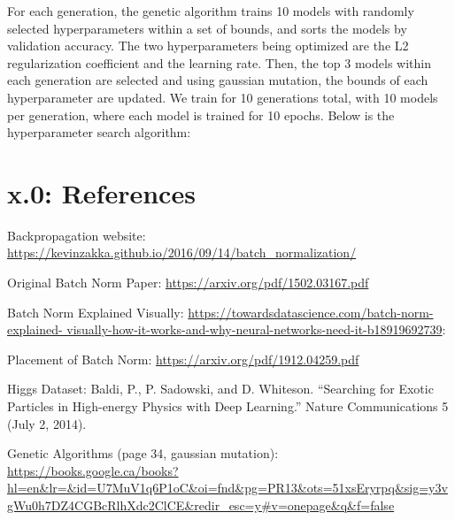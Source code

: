 \documentclass{article}
\begin{document}
\begin{multicols}{2}
For each generation, the genetic algorithm trains 10 models with randomly 
selected hyperparameters within a set of bounds, and sorts the models
by validation accuracy. The two hyperparameters being optimized are the 
L2 regularization coefficient and the learning rate. Then, the top 3 models
within each generation are selected and using gaussian mutation, the bounds of each hyperparameter 
are updated. We train for 10 generations total, with 10 models per generation, 
where each model is trained for 10 epochs. Below is the hyperparameter search algorithm:





\end{multicols}







\newpage
\section*{x.0: References}

Backpropagation website:
\url{https://kevinzakka.github.io/2016/09/14/batch_normalization/}

\noindent Original Batch Norm Paper:
\url{https://arxiv.org/pdf/1502.03167.pdf}

\noindent Batch Norm Explained Visually:
\url{https://towardsdatascience.com/batch-norm-explained-
visually-how-it-works-and-why-neural-networks-need-it-b18919692739}:


\noindent Placement of Batch Norm:
\url{https://arxiv.org/pdf/1912.04259.pdf}

\noindent Higgs Dataset:
Baldi, P., P. Sadowski, and D. Whiteson. “Searching for Exotic Particles in High-energy Physics with Deep Learning.” Nature Communications 5 (July 2, 2014).

\noindent Genetic Algorithms (page 34, gaussian mutation):
\url{https://books.google.ca/books?hl=en&lr=&id=U7MuV1q6P1oC&oi=fnd&pg=PR13&ots=51xsEryrpq&sig=y3vgWu0h7DZ4CGBcRlhXdc2ClCE&redir_esc=y#v=onepage&q&f=false}









\newpage
\end{document}
